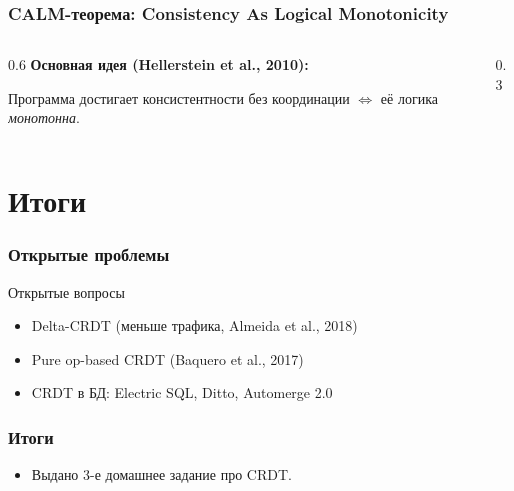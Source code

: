 \documentclass{beamer}
\begin{document}
\begin{frame}
\frametitle{CALM-теорема: Consistency As Logical Monotonicity}

\begin{columns}
\begin{column}{0.6\textwidth}
\textbf{Основная идея (Hellerstein et al., 2010):}

Программа достигает консистентности без координации $\Leftrightarrow$ её логика \emph{монотонна}.



\end{column}
\begin{column}{0.3\textwidth}
\end{column}
\end{columns}

\end{frame}


\section{Итоги}

\begin{frame}
\frametitle{Открытые проблемы}

\begin{exampleblock}{Открытые вопросы}
\small
\begin{itemize}
  \item Delta-CRDT (меньше трафика, Almeida et al., 2018)
  \item Pure op-based CRDT (Baquero et al., 2017)
  \item CRDT в БД: Electric SQL, Ditto, Automerge 2.0
\end{itemize}
\end{exampleblock}

\end{frame}

\begin{frame}
\frametitle{Итоги}

\begin{itemize}
\item Выдано 3-е домашнее задание про CRDT.
\end{itemize}


\end{frame}
\end{document}
